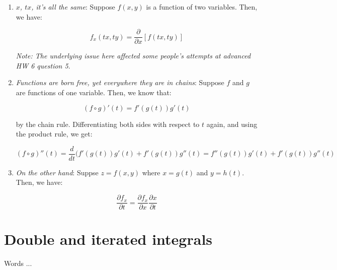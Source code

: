 \documentclass[10pt]{amsart}
\begin{document}
\begin{enumerate}
\item {\em $x$, $tx$, it's all the same}: Suppose $f(x,y)$ is a
  function of two variables. Then, we have:

  $$f_x(tx,ty) = \frac{\partial}{\partial x}[f(tx,ty)]$$

  {\em Note: The underlying issue here affected some people's attempts
  at advanced HW 6 question 5}.
\item {\em Functions are born free, yet everywhere they are in
  chains}: Suppose $f$ and $g$ are functions of one variable. Then, we
  know that:

  $$(f \circ g)'(t) = f'(g(t))g'(t)$$

  by the chain rule. Differentiating both sides with respect to $t$
  again, and using the product rule, we get:

  $$(f \circ g)''(t) = \frac{d}{dt}(f'(g(t))g'(t) + f'(g(t))g''(t) = f''(g(t))g'(t) + f'(g(t))g''(t)$$

\item {\em On the other hand}: Suppse $z = f(x,y)$ where $x = g(t)$ and
$y = h(t)$. Then, we have:

  $$\frac{\partial f_x}{\partial t} = \frac{\partial f_x}{\partial x}\frac{\partial x}{\partial t}$$
\end{enumerate}

\section{Double and iterated integrals}

Words ...
\end{document}
